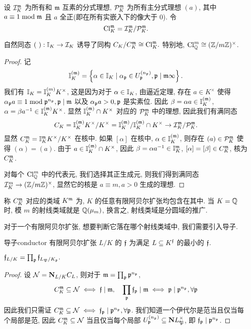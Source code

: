 设 $\CI_K^\fm$ 为所有和 $\fm$ 互素的分式理想, $\CP_K^\fm$ 为所有主分式理想 $(a)$, 其中 $a\equiv 1\mod\fm$ 且 $a$ 全正(即在所有实嵌入下的像大于 $0$). 令
  \[\Cl_K^\fm=\CI_K^\fm/\CP_K^\fm.\]

\begin{proposition}{}{}
自然同态 $(~):\BI_K\to \CI_K$ 诱导了同构 $C_K/C_K^\fm\cong \Cl_K^\fm.$ 特别地, $\Cl_\BQ^m\cong(\BZ/m\BZ)^\times$.
\end{proposition}
\begin{proof}
记
  \[\BI_K^{(\fm)}=\set{\alpha\in\BI_K\mid \alpha_\fp\in U_\fp^{(n_\fp)},\fp\mid \fm\infty}.\]
我们有 $\BI_K=\BI_K^{(m)}K^\times$, 这是因为对于 $\alpha\in\BI_K$, 由逼近定理, 存在 $a\in K^\times$ 使得 $\alpha_\fp a\equiv 1\mod \fp^{n_\fp},\fp\mid\fm$ 以及 $\alpha_\fp a>0,\fp$ 是实素位. 因此 $\beta=\alpha a\in\BI_K^{(\fm)}$, $\alpha=\beta a^{-1}\in\BI_K^{(\fm)}K^\times$. 显然 $\BI_K^{(\fm)}\cap K^\times$ 对应的 $\CP_K^\fm$ 中的理想, 因此我们有满同态
  \[C_K=\BI_K^{(\fm)}K^\times/K^\times=\BI_K^{(\fm)}/\BI_K^{(\fm)}\cap K^\times\to \CI_K^\fm/\CP_K^\fm.\]
显然 $C_K^\fm=\BI_K^\fm K^\times/K^\times$ 在核中. 如果 $[\alpha]$ 在核中, $\alpha\in \BI_K^{(\fm)}$, 则存在 $(a)\in \CP_K^\fm$ 使得 $(\alpha)=(a)$. 由于 $a\in \BI_K^{(\fm)}\cap K^\times$, 因此 $\beta=\alpha a^{-1}\in \BI_K^\fm$, $[\alpha]=[\beta]\in C_K^\fm$, 核为 $C_K^\fm$.

对每个 $\Cl_\BQ^m$ 中的代表元, 我们选择其正生成元, 则我们得到满同态 $\CI_K^m\to (\BZ/m\BZ)^\times$, 显然它的核是 $a\equiv m,a>0$ 生成的理想.
\end{proof}

称 $C_K^\fm$ 对应的类域 $K^\fm$ 为, $K$ 的任意有限阿贝尔扩张均包含在其中. 当 $K=\BQ$ 时, 模 $m$ 的射线类域就是 $\BQ(\mu_m)$, 换言之, 射线类域是分圆域的推广.

对于一个有限阿贝尔扩张, 想要判断它落在哪个射线类域中, 我们需要引入导子.

\begin{definition}{导子}{conductor}
有限阿贝尔扩张 $L/K$ 的 $\ff$ 为满足 $L\subseteq K^\ff$ 的最小的 $\ff$.
\end{definition}

\begin{proposition}{}{}
$\ff_{L/K}=\prod_\fp \ff_{L_\fP/K_\fp}.$
\end{proposition}
\begin{proof}
设 $\CN=\bfN_{L/K}C_L$, 则对于 $\fm=\prod_\fp \fp^{n_\fp}$,
  \[C_K^\fm\subseteq \CN\iff \ff\mid \fm,\quad
\prod_\fp \ff_\fp\mid\fm \iff \fp\mid \fp^{n_\fp},\forall\fp\]
因此我们只需证 $C_K^\fm\subseteq\CN\iff \ff_\fp\mid \fp^{n_\fp},\forall\fp$. 我们知道一个伊代尔是范当且仅当每个局部是范, 因此 $C_K^\fm\subseteq \CN$ 当且仅当每个局部 $U_\fp^{(n_\fp)}\subseteq \bfN L_\fP^\times$, 即 $\ff_\fp\mid\fp^{n_\fp}$.
\end{proof}

